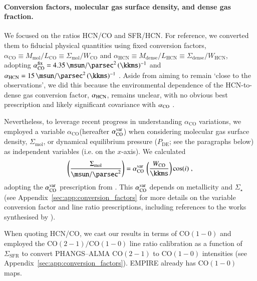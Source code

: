 \documentclass[letter, longauth]{aa} %
\newcommand*{\coone}{\ensuremath{\mathrm{CO(1-0)}}\xspace} %
\newcommand*{\cotwo}{\ensuremath{\mathrm{CO(2-1)}}\xspace} %
\newcommand*{\intCO}{\ensuremath{W_{\text{CO}}}\xspace}  %
\newcommand*{\intHCN}{\ensuremath{W_{\text{HCN}}}\xspace}  %
\newcommand*{\lco}{\ensuremath{L_{\text{CO}}}\xspace}  %
\newcommand*{\lhcn}{\ensuremath{L_{\text{HCN}}}\xspace}  %
\newcommand*{\sigmol}{\ensuremath{\Sigma_{\text{mol}}}\xspace}  %
\newcommand*{\pde}{\ensuremath{P_{\text{DE}}}\xspace}  %
\newcommand*{\alphaco}{\ensuremath{\alpha_{\text{CO}}}\xspace}  %
\newcommand*{\alphahcn}{\ensuremath{\alpha_{\text{HCN}}}\xspace}  %
\newcommand*{\sigsfr}{\ensuremath{\Sigma_{\text{SFR}}}\xspace}  %
\newcommand*{\mmol}{\ensuremath{M_{\text{mol}}}\xspace}  %
\newcommand*{\mdense}{\ensuremath{M_{\text{dense}}}\xspace}  %
\newcommand*{\sigdense}{\ensuremath{\Sigma_{\text{dense}}}\xspace}  %
\begin{document}
\paragraph{Conversion factors, molecular gas surface density, and dense gas fraction.} 
We focused on the ratios HCN/CO and SFR/HCN. 
For reference, we converted them to fiducial physical quantities using fixed conversion factors, $\alphaco\equiv\mmol/\lco\equiv\sigmol/\intCO$ and $\alphahcn\equiv\mdense/\lhcn\equiv\sigdense/\intHCN$, adopting $\alphaco^{\rm fix}=\SI{4.35}{\msun\per\square\parsec}\,(\SI{}{\kkms})^{-1}$ \citep{Bolatto2013} and $\alphahcn=\SI{15}{\msun\per\square\parsec}\,(\SI{}{\kkms})^{-1}$ \citep{Schinnerer2024}. 
Aside from aiming to remain `close to the observations', we did this because the environmental dependence of the HCN-to-dense gas conversion factor, $\alpha_{\rm HCN}$, remains unclear, with no obvious best prescription and likely significant covariance with $\alpha_{\rm CO}$ \citep[see][]{Usero2015}.

Nevertheless, to leverage recent progress in understanding \alphaco variations, we employed a variable \alphaco (hereafter $\alphaco^{\rm var}$) when considering molecular gas surface density, \sigmol, or dynamical equilibrium pressure (\pde; see the paragraphs below) as independent variables (i.e. on the $x$-axis). We calculated
\begin{align}
\left(\dfrac{\sigmol}{\SI{}{\msun\per\square\parsec}}\right) = \alphaco^{\rm var}\,\left(\dfrac{\intCO}{\SI{}{\kkms}}\right) \cos(i) \;,
\end{align}
adopting the $\alphaco^{\rm var}$ prescription from \citet{Schinnerer2024}. This $\alphaco^{\rm var}$ depends on metallicity and $\Sigma_\star$ (see Appendix~\ref{sec:app:conversion_factors} for more details on the variable conversion factor and line ratio prescriptions, including references to the works synthesised by \citealt{Schinnerer2024}).


When quoting HCN/CO, we cast our results in terms of \coone and employed the $\cotwo/\coone$ line ratio calibration as a function of \sigsfr to convert PHANGS--ALMA \cotwo to \coone intensities (see Appendix~\ref{sec:app:conversion_factors}). 
EMPIRE already has \coone maps.
\end{document}
